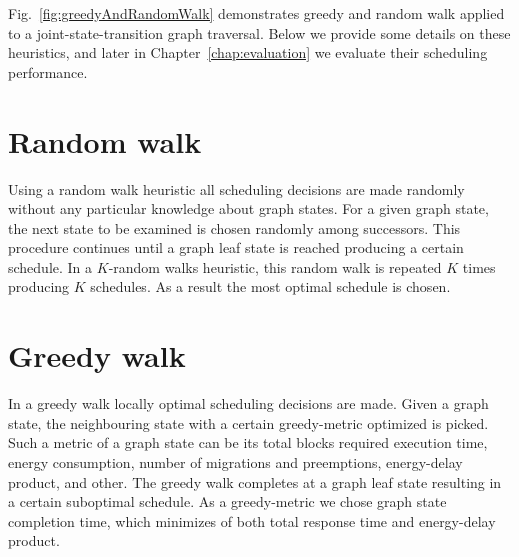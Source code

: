 Fig.~\ref{fig:greedyAndRandomWalk} demonstrates greedy and random walk applied to a joint-state-transition graph traversal. Below we provide some details on these heuristics, and later in Chapter~\ref{chap:evaluation} we evaluate their scheduling performance.

\section{Random walk}
\label{sec:randomWalk}

Using a random walk heuristic all scheduling decisions are made randomly without any particular knowledge about graph states. For a given graph state, the next state to be examined is chosen randomly among successors. This procedure continues until a graph leaf state is reached producing a certain schedule. In a $K$-random walks heuristic, this random walk is repeated $K$ times producing $K$ schedules. As a result the most optimal schedule is chosen.


\section{Greedy walk}
\label{sec:greedyWalk}

In a greedy walk locally optimal scheduling decisions are made. Given a graph state, the neighbouring state with a certain greedy-metric optimized is picked. Such a metric of a graph state can be its total blocks required execution time, energy consumption, number of migrations and preemptions, energy-delay product, and other. The greedy walk completes at a graph leaf state resulting in a certain suboptimal schedule. As a greedy-metric we chose graph state completion time, which minimizes of both total response time and energy-delay product.

